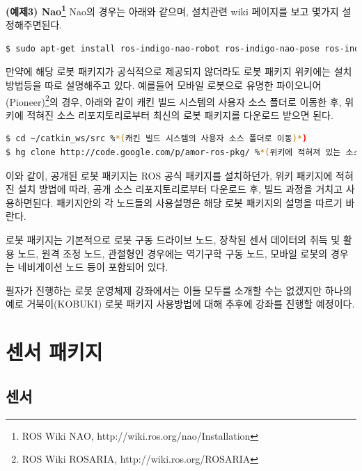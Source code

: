 \textbf{(예제3) Nao\footnote{ROS Wiki NAO, http://wiki.ros.org/nao/Installation}}
Nao의 경우는 아래와 같으며, 설치관련 wiki 페이지를 보고 몇가지 설정해주면된다.
\begin{lstlisting}[language=bash]
$ sudo apt-get install ros-indigo-nao-robot ros-indigo-nao-pose ros-indigo-nao-msgs ros-indigo-nao-driver ros-indigo-nao-description ros-indigo-nao-bringup ros-indigo-humanoid-nav-msg
\end{lstlisting}

만약에 해당 로봇 패키지가 공식적으로 제공되지 않더라도 로봇 패키지 위키에는 설치 방법등을 따로 설명해주고 있다. 예를들어 모바일 로봇으로 유명한 파이오니어(Pioneer)\footnote{ROS Wiki ROSARIA, http://wiki.ros.org/ROSARIA}의 경우, 아래와 같이 캐킨 빌드 시스템의 사용자 소스 폴더로 이동한 후, 위키에 적혀진 소스 리포지토리로부터 최신의 로봇 패키지를 다운로드 받으면 된다. 

\begin{lstlisting}[language=bash]
$ cd ~/catkin_ws/src %*(캐킨 빌드 시스템의 사용자 소스 폴더로 이동)*)
$ hg clone http://code.google.com/p/amor-ros-pkg/ %*(위키에 적혀져 있는 소스 리포지토리로부터 소스 다운로드)*)
\end{lstlisting}

이와 같이, 공개된 로봇 패키지는 ROS 공식 패키지를 설치하던가, 위키 패키지에 적혀진 설치 방법에 따라, 공개 소스 리포지토리로부터 다운로드 후, 빌드 과정을 거치고 사용하면된다. 패키지안의 각 노드들의 사용설명은 해당 로봇 패키지의 설명을 따르기 바란다.

로봇 패키지는 기본적으로 로봇 구동 드라이브 노드, 장착된 센서 데이터의 취득 및 활용 노드, 원격 조정 노드, 관절형인 경우에는 역기구학 구동 노드, 모바일 로봇의 경우는 네비게이션 노드 등이 포함되어 있다. 

필자가 진행하는 로봇 운영체제 강좌에서는 이들 모두를 소개할 수는 없겠지만 하나의 예로 거북이(KOBUKI) 로봇 패키지 사용방법에 대해 추후에 강좌를 진행할 예정이다.

\section{센서 패키지}

\subsection{센서}


